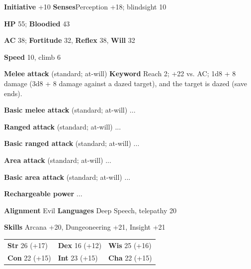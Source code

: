 \documentclass[mmgreen]{dnd4e}
\begin{document}
\begin{monster}{}
	\textbf{Initiative} +10 \qquad \textbf{Senses}Perception +18; blindsight 10 \par
	\textbf{HP} 55; \textbf{Bloodied} 43 \par
	\textbf{AC} 38; \textbf{Fortitude} 32, \textbf{Reﬂex} 38, \textbf{Will} 32 \par
	\textbf{Speed} 10, climb 6 \par
	\begin{monsterskill}{\melee \textbf{Melee attack} (standard; at-will) \diam \textbf{Keyword}}
		Reach 2; +22 vs. AC; 1d8 + 8 damage (3d8 + 8 damage against a dazed target), and the target is dazed (save ends).
	\end{monsterskill}
	\begin{monsterskill}{\meleeBase \textbf{Basic melee attack} (standard; at-will)}
		...
	\end{monsterskill}
	\begin{monsterskill}{\ranged \textbf{Ranged attack} (standard; at-will)}
	...
	\end{monsterskill}
	\begin{monsterskill}{\rangedBase \textbf{Basic ranged attack} (standard; at-will)}
		...
	\end{monsterskill}
	\begin{monsterskill}{\area \textbf{Area attack} (standard; at-will)}
		...
	\end{monsterskill}
	\begin{monsterskill}{\areaBase \textbf{Basic area attack} (standard; at-will)}
		...
	\end{monsterskill}
	\begin{monsterskill}{\textbf{Rechargeable power} \done \dtwo \dthree \dfour \dfive \dsix}
		...
	\end{monsterskill}
	\begin{darkline}
		\textbf{Alignment} Evil \qquad \textbf{Languages} Deep Speech, telepathy 20


		\textbf{Skills} Arcana +20, Dungeoneering +21, Insight +21

		\begin{tabular}{lll}
			\textbf{Str} 26 (+17) &
			\textbf{Dex} 16 (+12) &
			\textbf{Wis} 25 (+16) \\
			\textbf{Con} 22 (+15) &
			\textbf{Int} 23 (+15) &
			\textbf{Cha} 22 (+15)
		\end{tabular}
	\end{darkline}
\end{monster}
\end{document}
